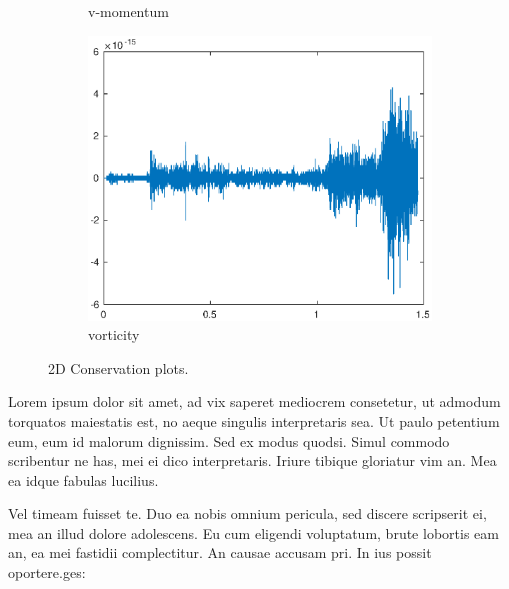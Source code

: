 \begin{figure}[h!]
\begin{subfigure}[b]{0.3\textwidth}
        \caption{v-momentum}
        \label{fig:momv}
    \end{subfigure}
    \hfill
    \begin{subfigure}[b]{0.3\textwidth}
        \centering
        \includegraphics[width=\textwidth]{images/cons_vort.eps}\hfill
        \caption{vorticity}
        \label{fig:vort}
    \end{subfigure}
     \hfill
    \caption{2D Conservation plots.}
    \label{fig:three graphs}
\end{figure}



Lorem ipsum dolor sit amet, ad vix saperet mediocrem consetetur, ut admodum torquatos maiestatis est, 
no aeque singulis interpretaris sea. Ut paulo petentium eum, eum id malorum dignissim. Sed ex modus quodsi. 
Simul commodo scribentur ne has, mei ei dico interpretaris. Iriure tibique gloriatur vim an. Mea ea idque 
fabulas lucilius.

Vel timeam fuisset te. Duo ea nobis omnium pericula, sed discere scripserit ei, mea an illud dolore adolescens.
 Eu cum eligendi voluptatum, brute lobortis eam an, ea mei fastidii complectitur. An causae accusam pri. 
 In ius possit oportere.ges: